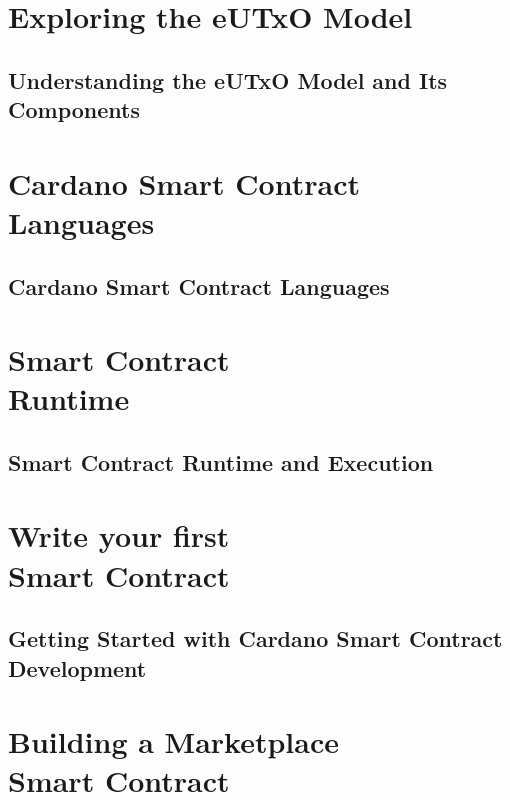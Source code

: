 \part{Exploring the eUTxO Model}
\newpage
\chapter{Understanding the eUTxO Model and Its Components} \label{ch:exploring}



\part{Cardano Smart Contract Languages}
\newpage
\chapter{Cardano Smart Contract Languages} \label{ch:Languages}


\part{Smart Contract\\ Runtime}
\newpage
\chapter{Smart Contract Runtime and Execution} \label{ch:Runtime}


\part{Write your first\\ Smart Contract}
\newpage
\chapter{Getting Started with Cardano Smart Contract Development} \label{ch:Getting started}


\part{Building a Marketplace\\ Smart Contract}
\newpage
